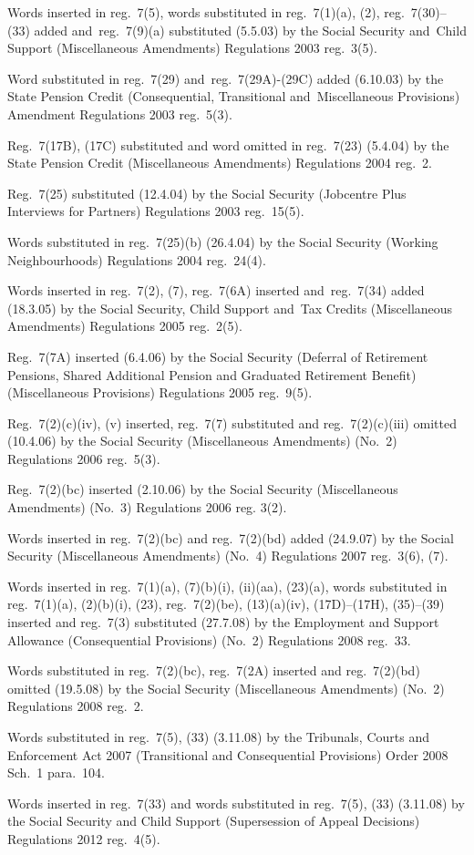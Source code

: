 \documentclass[12pt,a4paper]{article}
\begin{document}
{Words inserted in reg.~7(5), words substituted in reg.~7(1)(a), (2), reg.~7(30)--(33) added and~reg.~7(9)(a) substituted (5.5.03) by the Social Security and~Child Support (Miscellaneous Amendments) Regulations 2003 reg.~3(5).

Word substituted in reg.~7(29) and~reg.~7(29A)-(29C) added (6.10.03) by the State Pension Credit (Consequential, Transitional and~Miscellaneous Provisions) Amendment Regulations 2003 reg.~5(3).

Reg.~7(17B), (17C) substituted and word omitted in reg.~7(23) (5.4.04) by the State Pension Credit (Miscellaneous Amendments) Regulations 2004 reg.~2.

Reg.~7(25) substituted (12.4.04) by the Social Security (Jobcentre Plus Interviews for Partners) Regulations 2003 reg.~15(5).

Words substituted in reg.~7(25)(b) (26.4.04) by the Social Security (Working Neighbourhoods) Regulations 2004 reg.~24(4).

Words inserted in reg.~7(2), (7), reg.~7(6A) inserted and~reg.~7(34) added (18.3.05) by the Social Security, Child Support and~Tax Credits (Miscellaneous Amendments) Regulations 2005 reg.~2(5).

Reg.~7(7A) inserted (6.4.06) by the Social Security (Deferral of Retirement Pensions, Shared Additional Pension and Graduated Retirement Benefit) (Miscellaneous Provisions) Regulations 2005 reg.~9(5).

Reg.~7(2)(c)(iv), (v) inserted, reg.~7(7) substituted and reg.~7(2)(c)(iii) omitted (10.4.06) by the Social Security (Miscellaneous Amendments) (No.~2) Regulations 2006 reg.~5(3).

Reg.~7(2)(bc) inserted (2.10.06) by the Social Security (Miscellaneous Amendments) (No.~3) Regulations 2006 reg. 3(2).

Words inserted in reg.~7(2)(bc) and reg.~7(2)(bd) added (24.9.07) by the Social Security (Miscellaneous Amendments) (No.~4) Regulations 2007 reg.~3(6), (7).

Words inserted in reg.~7(1)(a), (7)(b)(i), (ii)(aa), (23)(a), words substituted in reg.~7(1)(a), (2)(b)(i), (23), reg.~7(2)(be), (13)(a)(iv), (17D)--(17H), (35)--(39) inserted and reg.~7(3) substituted (27.7.08) by the Employment and Support Allowance (Consequential Provisions) (No.~2) Regulations 2008 reg.~33.

Words substituted in reg.~7(2)(bc), reg.~7(2A) inserted and reg.~7(2)(bd) omitted (19.5.08) by the Social Security (Miscellaneous Amendments) (No.~2) Regulations 2008 reg.~2.

Words substituted in reg.~7(5), (33) (3.11.08) by the Tribunals, Courts and Enforcement Act 2007 (Transitional and Consequential Provisions) Order 2008 Sch.~1 para.~104.

Words inserted in reg.~7(33) and words substituted in reg.~7(5), (33) (3.11.08) by the Social Security and Child Support (Supersession of Appeal Decisions) Regulations 2012 reg.~4(5).
}
\end{document}
